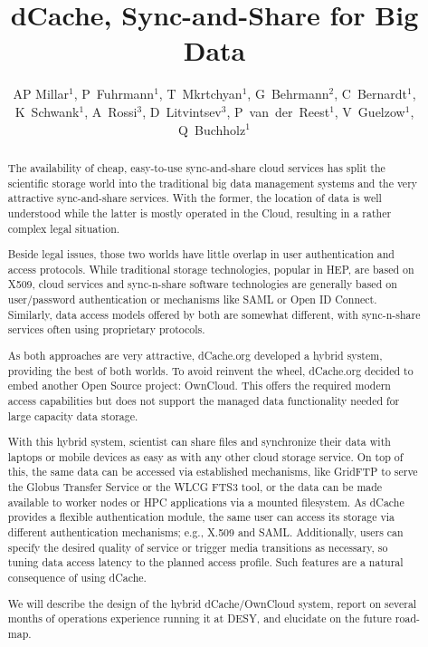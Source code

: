 \documentclass[a4paper]{jpconf}
\begin{document}
\title{dCache, Sync-and-Share for Big Data}

\author{AP Millar$^1$, P~Fuhrmann$^1$, T~Mkrtchyan$^1$,
  G~Behrmann$^2$, C~Bernardt$^1$, K~Schwank$^1$, A~Rossi$^3$,
  D~Litvintsev$^3$, P~van~der~Reest$^1$, V~Guelzow$^1$,
  Q~Buchholz$^1$}

\address{$^1$ IT Dept., DESY, Notkestrasse 85, Hamburg, Germany}
\address{$^2$ NORDUnet, Copenhagen, Denmark}
\address{$^3$ Fermilab, Chicago, IL, USA}


\begin{abstract}
The availability of cheap, easy-to-use sync-and-share cloud services
has split the scientific storage world into the traditional big data
management systems and the very attractive sync-and-share
services. With the former, the location of data is well understood
while the latter is mostly operated in the Cloud, resulting in a
rather complex legal situation.

Beside legal issues, those two worlds have little overlap in user
authentication and access protocols. While traditional storage
technologies, popular in HEP, are based on X509, cloud services and
sync-n-share software technologies are generally based on
user/password authentication or mechanisms like SAML or Open ID
Connect. Similarly, data access models offered by both are somewhat
different, with sync-n-share services often using proprietary
protocols.

As both approaches are very attractive, dCache.org developed a hybrid
system, providing the best of both worlds. To avoid reinvent the
wheel, dCache.org decided to embed another Open Source project:
OwnCloud. This offers the required modern access capabilities but does
not support the managed data functionality needed for large capacity
data storage.

With this hybrid system, scientist can share files and synchronize
their data with laptops or mobile devices as easy as with any other
cloud storage service. On top of this, the same data can be accessed
via established mechanisms, like GridFTP to serve the Globus Transfer
Service or the WLCG FTS3 tool, or the data can be made available to
worker nodes or HPC applications via a mounted filesystem. As dCache
provides a flexible authentication module, the same user can access
its storage via different authentication mechanisms; e.g., X.509 and
SAML. Additionally, users can specify the desired quality of service
or trigger media transitions as necessary, so tuning data access
latency to the planned access profile. Such features are a natural
consequence of using dCache.

We will describe the design of the hybrid dCache/OwnCloud system,
report on several months of operations experience running it at DESY,
and elucidate on the future road-map.
\end{abstract}
\end{document}
